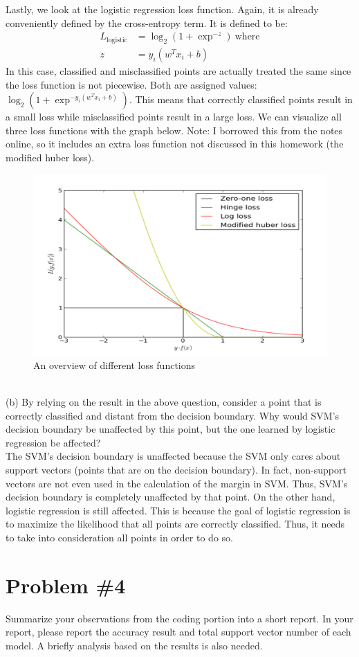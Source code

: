 \documentclass[12pt]{article}
\begin{document}
	Lastly, we look at the logistic regression loss function. Again, it is already conveniently defined by the cross-entropy term. It is defined to be:
		\begin{align*}
		L_{\text{logistic}} &= \log_2(1+\exp^{-z}) \ \text{where} \\
		z&= y_i(w^Tx_i+b)
		\end{align*}
	In this case, classified and misclassified points are actually treated the same since the loss function is not piecewise. Both are assigned values: $\log_2(1+\exp^{-y_i(w^Tx_i+b)})$. This means that correctly classified points result in a small loss while misclassified points result in a large loss. We can visualize all three loss functions with the graph below. Note: I borrowed this from the notes online, so it includes an extra loss function not discussed in this homework (the modified huber loss).
	\begin{figure}[h]
		\begin{center}
			\includegraphics[width=5in]{unified_loss.png}
			\caption{An overview of different loss functions}
			\label{fig:sigmoidEx}
		\end{center}
	\end{figure}
	\\
	(b) By relying on the result in the above question, consider a point that is correctly classified and distant from the decision boundary. Why would SVM’s decision boundary be unaffected by this point, but the one learned by logistic regression be affected? \\
	The SVM's decision boundary is unaffected because the SVM only cares about support vectors (points that are on the decision boundary). In fact, non-support vectors are not even used in the calculation of the margin in SVM. Thus, SVM's decision boundary is completely unaffected by that point. On the other hand, logistic regression is still affected. This is because the goal of logistic regression is to maximize the likelihood that all points are correctly classified. Thus, it needs to take into consideration all points in order to do so. 
	
	\section*{Problem \#4}
	Summarize your observations from the coding portion into a short report. In your report, please report the accuracy result and total support vector number of each model. A briefly analysis based on the results is also needed.
	
	
\end{document}
